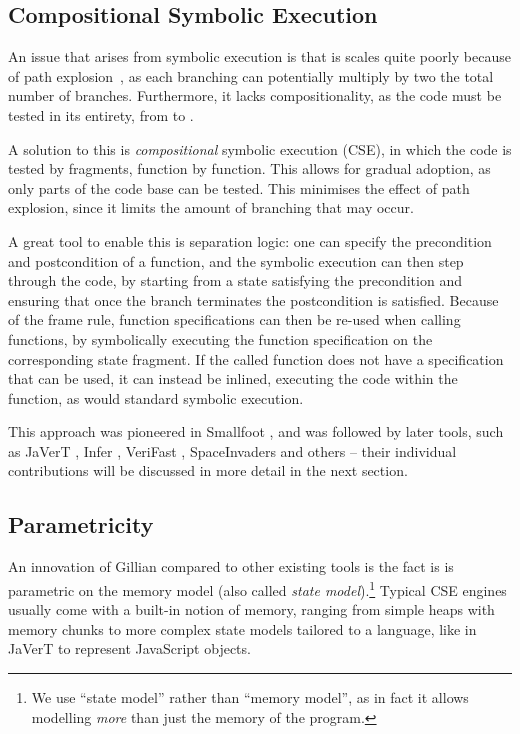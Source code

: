\subsection{Compositional Symbolic Execution}

An issue that arises from symbolic execution is that is scales quite poorly because of path explosion~\cite{pathexplo,surveysymex}, as each branching can potentially multiply by two the total number of branches. Furthermore, it lacks compositionality, as the code must be tested in its entirety, from  to .

A solution to this is \emph{compositional} symbolic execution (CSE), in which the code is tested by fragments, function by function. This allows for gradual adoption, as only parts of the code base can be tested. This minimises the effect of path explosion, since it limits the amount of branching that may occur.

A great tool to enable this is separation logic: one can specify the precondition and postcondition of a function, and the symbolic execution can then step through the code, by starting from a state satisfying the precondition and ensuring that once the branch terminates the postcondition is satisfied. Because of the frame rule, function specifications can then be re-used when calling functions, by symbolically executing the function specification on the corresponding state fragment. If the called function does not have a specification that can be used, it can instead be inlined, executing the code within the function, as would standard symbolic execution.

This approach was pioneered in Smallfoot \cite{smallfoot}, and was followed by later tools, such as JaVerT \cite{javert1, javert2}, Infer \cite{infer}, VeriFast \cite{verifast}, SpaceInvaders \cite{spaceinvader} and others -- their individual contributions will be discussed in more detail in the next section.

\subsection{Parametricity}

An innovation of Gillian compared to other existing tools is the fact is is parametric on the memory model (also called \emph{state model}).\footnote{We use ``state model'' rather than ``memory model'', as in fact it allows modelling \emph{more} than just the memory of the program.} Typical CSE engines usually come with a built-in notion of memory, ranging from simple heaps with memory chunks \cite{verifast} to more complex state models tailored to a language, like in JaVerT \cite{javert1, javert2} to represent JavaScript objects.

